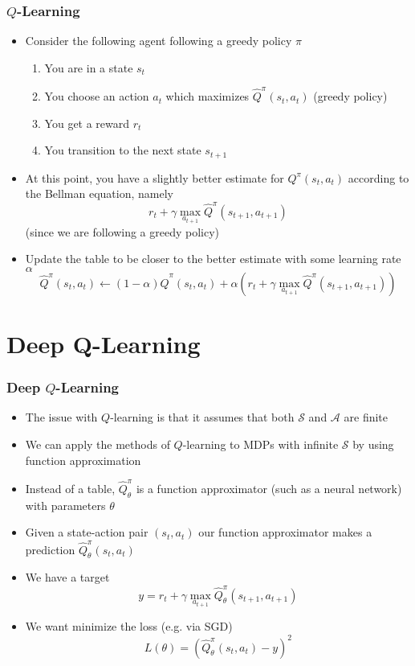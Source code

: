 \documentclass{beamer}
\begin{document}
\begin{frame}
  \frametitle{$Q$-Learning}
  \begin{itemize}
    \item Consider the following agent following a greedy policy $\pi$
    \begin{enumerate}
      \item You are in a state $s_t$
      \item You choose an action $a_t$ which maximizes $\widehat{Q}^\pi(s_t, a_t)$ (greedy policy)
      \item You get a reward $r_t$
      \item You transition to the next state $s_{t+1}$
    \end{enumerate}
    \item At this point, you have a slightly better estimate for $Q^\pi(s_t, a_t)$ according to the Bellman equation, namely $$r_t + \gamma \max_{a_{t+1}} \widehat{Q}^\pi (s_{t+1}, a_{t+1})$$ (since we are following a greedy policy)
    \item Update the table to be closer to the better estimate with some learning rate $\alpha$ $$\widehat{Q}^\pi(s_t, a_t) \gets (1 - \alpha) \widehat{Q}^\pi (s_t, a_t) + \alpha \left( r_t + \gamma \max_{a_{t+1}} \widehat{Q}^\pi (s_{t+1}, a_{t+1}) \right) $$
  \end{itemize}
\end{frame}

\section{Deep Q-Learning}

\begin{frame}
  \frametitle{Deep $Q$-Learning}
  \begin{itemize}
    \item The issue with $Q$-learning is that it assumes that both $\mathcal{S}$ and $\mathcal{A}$ are finite
    \item We can apply the methods of $Q$-learning to MDPs with infinite $\mathcal{S}$ by using function approximation
    \item Instead of a table, $\widehat{Q}_{\theta}^\pi$ is a function approximator (such as a neural network) with parameters $\theta$
    \item Given a state-action pair $(s_t, a_t)$ our function approximator makes a prediction $\widehat{Q}_{\theta}^\pi(s_t, a_t)$
    \item We have a target $$y = r_t + \gamma \max_{a_{t+1}} \widehat{Q}_{\theta}^\pi (s_{t+1}, a_{t+1})$$
    \item We want minimize the loss (e.g. via SGD)
    $$L(\theta) = \left( \widehat{Q}_{\theta}^\pi(s_t, a_t) - y \right)^2$$
  \end{itemize}
\end{frame}
\end{document}
